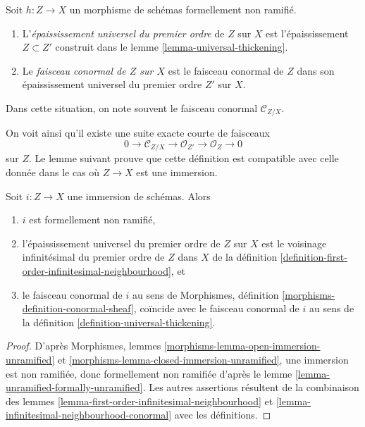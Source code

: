 \begin{definition}
\label{definition-universal-thickening}
Soit $h : Z \to X$ un morphisme de schémas formellement non ramifié.
\begin{enumerate}
\item L'{\it épaississement universel du premier ordre} de $Z$ sur $X$
est l'épaississement $Z \subset Z'$ construit dans
le lemme \ref{lemma-universal-thickening}.
\item Le {\it faisceau conormal de $Z$ sur $X$} est le faisceau conormal
de $Z$ dans son épaississement universel du premier ordre $Z'$ sur $X$.
\end{enumerate}
Dans cette situation, on note souvent le faisceau conormal $\mathcal{C}_{Z/X}$.
\end{definition}

\noindent
On voit ainsi qu'il existe une suite exacte courte de faisceaux
$$
0 \to \mathcal{C}_{Z/X} \to \mathcal{O}_{Z'} \to \mathcal{O}_Z \to 0
$$
sur $Z$.
Le lemme suivant prouve que cette définition est compatible
avec celle donnée dans le cas où $Z \to X$ est une immersion.

\begin{lemma}
\label{lemma-immersion-universal-thickening}
Soit $i : Z \to X$ une immersion de schémas. Alors
\begin{enumerate}
\item $i$ est formellement non ramifié,
\item l'épaississement universel du premier ordre de $Z$ sur $X$ est le voisinage
infinitésimal du premier ordre de $Z$ dans $X$ de
la définition \ref{definition-first-order-infinitesimal-neighbourhood}, et
\item le faisceau conormal de $i$ au sens de
Morphismes, définition \ref{morphisms-definition-conormal-sheaf},
coïncide avec le faisceau conormal de $i$ au sens de
la définition \ref{definition-universal-thickening}.
\end{enumerate}
\end{lemma}

\begin{proof}
D'après
Morphismes, lemmes \ref{morphisms-lemma-open-immersion-unramified} et
\ref{morphisms-lemma-closed-immersion-unramified},
une immersion est non ramifiée, donc formellement non ramifiée d'après
le lemme \ref{lemma-unramified-formally-unramified}.
Les autres assertions résultent de la combinaison
des lemmes \ref{lemma-first-order-infinitesimal-neighbourhood} et
\ref{lemma-infinitesimal-neighbourhood-conormal}
avec les définitions.
\end{proof}

